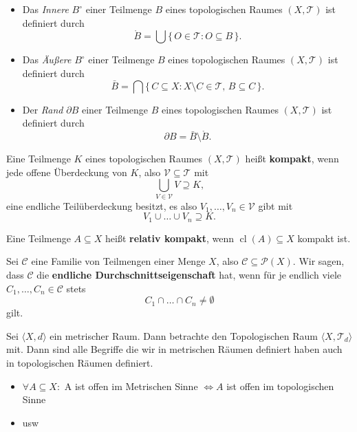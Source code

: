 {
\begin{itemize}
\item Das \textit{Innere} $B^{\circ}$ einer Teilmenge $B$ eines topologischen Raumes $(X, \mathcal{T})$
ist definiert durch
$$
   \mathring{B} = \bigcup \{\, O \in \mathcal{T} : O \subseteq B \,\}.
$$
\item Das \textit{Äußere} $B^{\circ}$ einer Teilmenge $B$ eines topologischen Raumes $(X, \mathcal{T})$
ist definiert durch
$$
   \bar{B} = \bigcap \{\, C \subseteq X : X \setminus C \in \mathcal{T},\, B \subseteq C \,\}.
$$
\item Der \textit{Rand} $\partial B$ einer Teilmenge $B$ eines topologischen Raumes $(X, \mathcal{T})$
ist definiert durch
$$
  \partial B = \bar{B} \setminus  \mathring{B}.
$$
\end{itemize} 
}

{
  Eine Teilmenge $K$ eines topologischen Raumes $(X, \mathcal{T})$ heißt \textbf{kompakt},  
wenn jede offene Überdeckung von $K$, also $\mathcal{V} \subseteq \mathcal{T}$ mit
\begin{equation*}
  \bigcup_{V \in \mathcal{V}} V \supseteq K,
\end{equation*}
eine endliche Teilüberdeckung besitzt, es also $V_1, \ldots, V_n \in \mathcal{V}$ gibt mit
\begin{equation*}
  V_1 \cup \dots \cup V_n \supseteq K.
\end{equation*}

Eine Teilmenge $A \subseteq X$ heißt \textbf{relativ kompakt},  
wenn $\operatorname{cl}(A) \subseteq X$ kompakt ist.

Sei $\mathcal{C}$ eine Familie von Teilmengen einer Menge $X$, also $\mathcal{C} \subseteq \mathcal{P}(X)$.  
Wir sagen, dass $\mathcal{C}$ die \textbf{endliche Durchschnittseigenschaft} hat,  
wenn für je endlich viele $C_1, \ldots, C_n \in \mathcal{C}$ stets
\begin{equation*}
  C_1 \cap \dots \cap C_n \neq \emptyset
\end{equation*}
gilt.
}

{
Sei $\langle X,d \rangle $ ein metrischer Raum. Dann betrachte den Topologischen Raum $\langle X, \mathcal{T}_d \rangle$ mit.
Dann sind alle Begriffe die wir in metrischen Räumen definiert haben auch in topologischen Räumen definiert.
\begin{itemize}
  \item $\forall A \subseteq X:$ A ist offen im Metrischen Sinne $\Leftrightarrow A $ ist offen im topologischen Sinne
  \item usw
\end{itemize}
}
